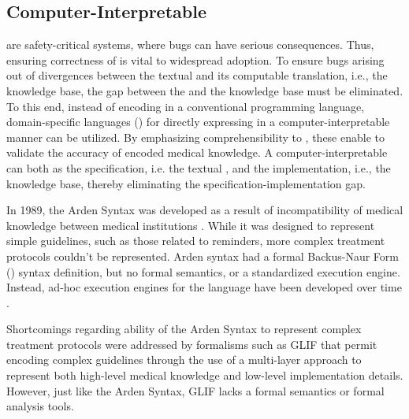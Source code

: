 \subsection{Computer-Interpretable \BPGs{}}

\CDSSs{} are safety-critical systems, where bugs can have serious consequences.
Thus, ensuring correctness of \CDSSs{} is vital to widespread adoption.
To ensure bugs arising out of divergences between the textual \BPG{}
and its computable translation, i.e., the knowledge base, the gap between
the \BPG{} and the knowledge base must be eliminated. To this end, instead of
encoding \BPGs{} in a conventional programming language, domain-specific
languages (\DSLs{}) for directly expressing \BPGs{} in a computer-interpretable manner can
be utilized. By emphasizing comprehensibility to \HCPs{}, these \DSLs{} enable
\HCPs{} to validate the accuracy of encoded medical knowledge.
A computer-interpretable \BPGs{} can both as the specification, i.e. the textual \BPG{},
and the implementation, i.e., the knowledge base, thereby eliminating the
specification-implementation gap.

In 1989, the Arden Syntax was developed as a result of incompatibility
of medical knowledge between medical institutions \cite{HripcsakCBM94}.
While it was designed to represent simple guidelines,
such as those related to reminders, more complex treatment protocols couldn't
be represented. Arden syntax had a formal Backus-Naur Form (\BNF{})
syntax definition, but no formal semantics, or a standardized execution engine.
Instead, ad-hoc execution engines for the language have been developed over
time \cite{ClerqAIM03}.

Shortcomings regarding ability of the Arden Syntax to represent complex
treatment protocols were addressed by formalisms such as GLIF \cite{PelegAMIA00}
that permit encoding complex guidelines through the use of a multi-layer
approach to represent both high-level medical knowledge and low-level
implementation details. However, just like the Arden Syntax, GLIF lacks
a formal semantics or formal analysis tools.

